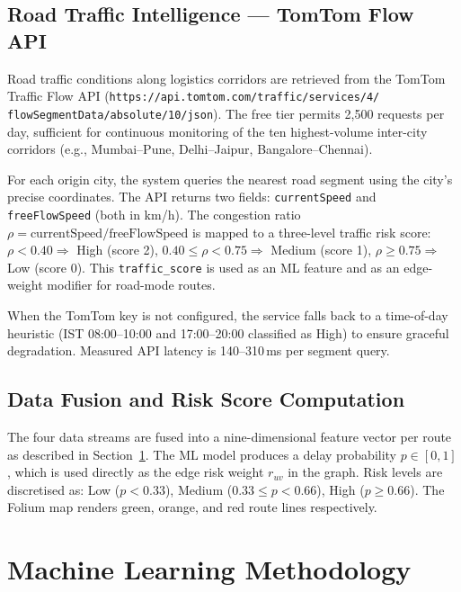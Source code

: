 \documentclass[conference]{IEEEtran}
\begin{document}
\subsection{Road Traffic Intelligence — TomTom Flow API}

Road traffic conditions along logistics corridors are retrieved
from the TomTom Traffic Flow API
(\texttt{https://api.tomtom.com/traffic/services/4/\\flowSegmentData/absolute/10/json}).
The free tier permits 2,500 requests per day, sufficient for
continuous monitoring of the ten highest-volume inter-city
corridors (e.g., Mumbai–Pune, Delhi–Jaipur, Bangalore–Chennai).

For each origin city, the system queries the nearest road
segment using the city's precise coordinates. The API returns
two fields: \texttt{currentSpeed} and \texttt{freeFlowSpeed}
(both in km/h). The congestion ratio $\rho = \text{currentSpeed}
/ \text{freeFlowSpeed}$ is mapped to a three-level traffic risk
score: $\rho < 0.40 \Rightarrow$ High (score 2),
$0.40 \leq \rho < 0.75 \Rightarrow$ Medium (score 1),
$\rho \geq 0.75 \Rightarrow$ Low (score 0). This
\texttt{traffic\_score} is used as an ML feature and as an
edge-weight modifier for road-mode routes.

When the TomTom key is not configured, the service falls back
to a time-of-day heuristic (IST 08:00–10:00 and 17:00–20:00
classified as High) to ensure graceful degradation.
Measured API latency is 140–310\,ms per segment query.

\subsection{Data Fusion and Risk Score Computation}

The four data streams are fused into a nine-dimensional feature
vector per route as described in Section~\ref{sec:ml}. The ML
model produces a delay probability $p \in [0,1]$, which is used
directly as the edge risk weight $r_{uv}$ in the graph. Risk
levels are discretised as: Low ($p < 0.33$), Medium
($0.33 \leq p < 0.66$), High ($p \geq 0.66$). The Folium map
renders green, orange, and red route lines respectively.


\section{Machine Learning Methodology}
\label{sec:ml}
\end{document}
